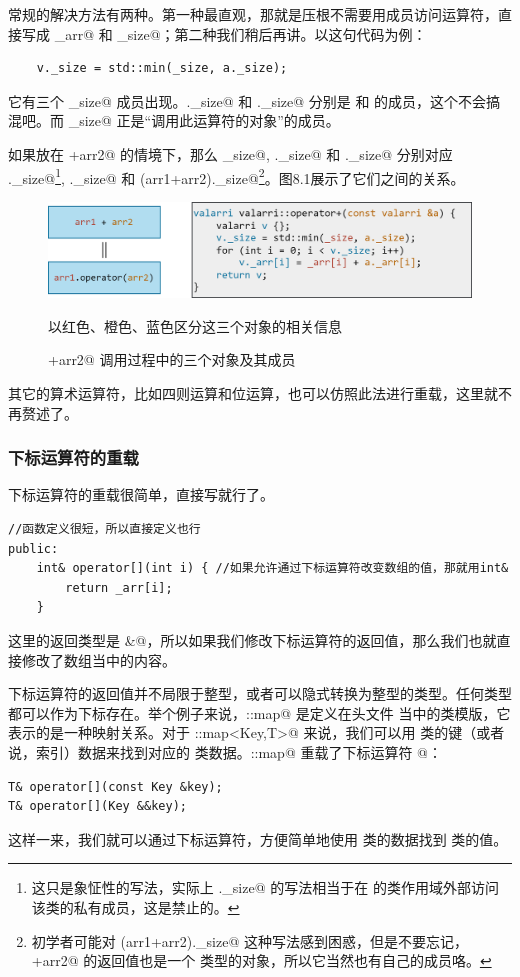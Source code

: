 常规的解决方法有两种。第一种最直观，那就是压根不需要用成员访问运算符，直接写成 \lstinline@_arr@ 和 \lstinline@_size@；第二种我们稍后再讲。以这句代码为例：
\begin{lstlisting}
    v._size = std::min(_size, a._size);
\end{lstlisting}
它有三个 \lstinline@_size@ 成员出现。\lstinline@v._size@ 和 \lstinline@a._size@ 分别是 \lstinline@v@ 和 \lstinline@a@ 的成员，这个不会搞混吧。而 \lstinline@_size@ 正是``调用此运算符的对象''的成员。\par
如果放在 +arr2@ 的情境下，那么 \lstinline@_size@, \lstinline@a._size@ 和 \lstinline@v._size@ 分别对应 ._size@\footnote{这只是象怔性的写法，实际上 ._size@ 的写法相当于在 \lstinline@valarri@ 的类作用域外部访问该类的私有成员，这是禁止的。}, ._size@ 和 \lstinline@(arr1+arr2)._size@\footnote{初学者可能对 \lstinline@(arr1+arr2)._size@ 这种写法感到困惑，但是不要忘记，+arr2@ 的返回值也是一个 \lstinline@valarri@ 类型的对象，所以它当然也有自己的成员咯。}。图8.1展示了它们之间的关系。\par
\begin{figure}[htbp]
    \centering
    \includegraphics[width=\textwidth]{../images/generalized_parts/08_operator_overloading_as_member_function_300.png}
    \caption{+arr2@ 调用过程中的三个对象及其成员}
    \footnotesize{以红色、橙色、蓝色区分这三个对象的相关信息}
\end{figure}
其它的算术运算符，比如四则运算和位运算，也可以仿照此法进行重载，这里就不再赘述了。\par
\subsubsection*{下标运算符的重载}
下标运算符的重载很简单，直接写就行了。
\begin{lstlisting}
//函数定义很短，所以直接定义也行
public:
    int& operator[](int i) { //如果允许通过下标运算符改变数组的值，那就用int&
        return _arr[i];
    }
\end{lstlisting}
这里的返回类型是 \lstinline@int&@，所以如果我们修改下标运算符的返回值，那么我们也就直接修改了数组当中的内容。\par
下标运算符的返回值并不局限于整型，或者可以隐式转换为整型的类型。任何类型都可以作为下标存在。举个例子来说，\lstinline@std::map@ 是定义在头文件 \lstinline@map@ 当中的类模版，它表示的是一种映射关系。对于 \lstinline@std::map<Key,T>@ 来说，我们可以用 \lstinline@Key@ 类的键（或者说，索引）数据来找到对应的 \lstinline@T@ 类数据。\lstinline@std::map@ 重载了下标运算符 \lstinline@[]@：
\begin{lstlisting}
T& operator[](const Key &key);
T& operator[](Key &&key);
\end{lstlisting}
这样一来，我们就可以通过下标运算符，方便简单地使用 \lstinline@Key@ 类的数据找到 \lstinline@T@ 类的值。\par
